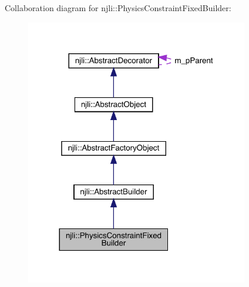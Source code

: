 Collaboration diagram for njli\+:\+:Physics\+Constraint\+Fixed\+Builder\+:\nopagebreak
\begin{figure}[H]
\begin{center}
\leavevmode
\includegraphics[width=276pt]{classnjli_1_1_physics_constraint_fixed_builder__coll__graph}
\end{center}
\end{figure}
